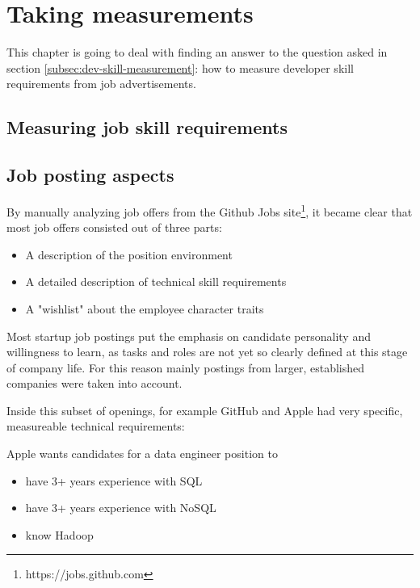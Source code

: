 \chapter{Taking measurements}
This chapter is going to deal with finding an answer
to the question asked in section \ref{subsec:dev-skill-measurement}:
how to measure developer skill requirements from job advertisements.

\section{Measuring job skill requirements}
%

\section{Job posting aspects}
By manually analyzing job offers from the Github Jobs
site\footnote{https://jobs.github.com}, it became clear that most
job offers consisted out of three parts:

\begin{itemize}
\item A description of the position environment
\item A detailed description of technical skill requirements
\item A "wishlist" about the employee character traits
\end{itemize}

Most startup job postings put the emphasis on candidate personality and
willingness to learn, as tasks and roles are not yet so clearly defined
at this stage of company life. For this reason mainly postings from larger, established companies were taken into account.
\newline

Inside this subset of openings, for example GitHub and Apple had very
specific, measureable technical requirements:
\newline

Apple wants candidates for a data engineer position to
\begin{itemize}
    \item have 3+ years experience with SQL
    \item have 3+ years experience with NoSQL
    \item know Hadoop
\end{itemize}

